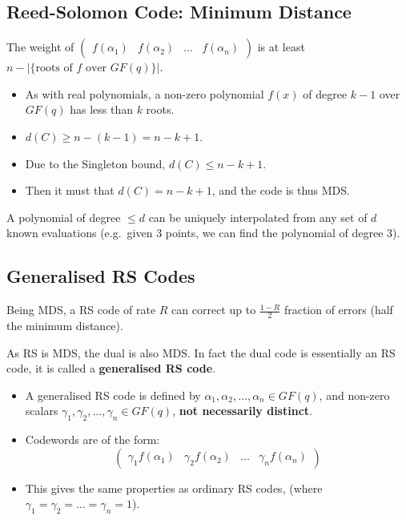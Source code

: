 \documentclass[11pt]{article}
\begin{document}
\subsection{Reed-Solomon Code: Minimum Distance}
The weight of $
  \begin{pmatrix}
    f(\alpha_1) & f(\alpha_2) & \dots & f(\alpha_n)
  \end{pmatrix}
$ is at least $n - \lvert \{ \text{roots of $f$ over $GF(q)$} \} \rvert$.
\begin{itemize}
  \item As with real polynomials, a non-zero polynomial $f(x)$ of degree $k - 1$ over $GF(q)$ has less than $k$ roots.
  \item $d(C) \geq n - (k - 1) = n - k + 1$.
  \item Due to the Singleton bound, $d(C) \leq n - k + 1$.
  \item Then it must that $d(C) = n - k + 1$, and the code is thus MDS.
\end{itemize}

A polynomial of degree $\leq d$ can be uniquely interpolated from any set of $d$ known evaluations (e.g.\ given $3$ points, we can find the polynomial of degree $3$).

\subsection{Generalised RS Codes}
Being MDS, a RS code of rate $R$ can correct up to $\frac{1 - R}{2}$ fraction of errors (half the minimum distance).

As RS is MDS, the dual is also MDS.
In fact the dual code is essentially an RS code, it is called a \textbf{generalised RS code}.

\begin{itemize}
  \item A generalised RS code is defined by $\alpha_1, \alpha_2, \dots, \alpha_n \in GF(q)$, and non-zero scalars $\gamma_1, \gamma_2, \ldots, \gamma_n \in GF(q)$, \textbf{not necessarily distinct}.
  \item Codewords are of the form:
    \[
      \begin{pmatrix}
        \gamma_1f(\alpha_1) & \gamma_2f(\alpha_2) & \dots & \gamma_nf(\alpha_n)
      \end{pmatrix}
    \]
  \item This gives the same properties as ordinary RS codes, (where $\gamma_1 = \gamma_2 = \ldots = \gamma_n = 1$).
\end{itemize}
\end{document}
